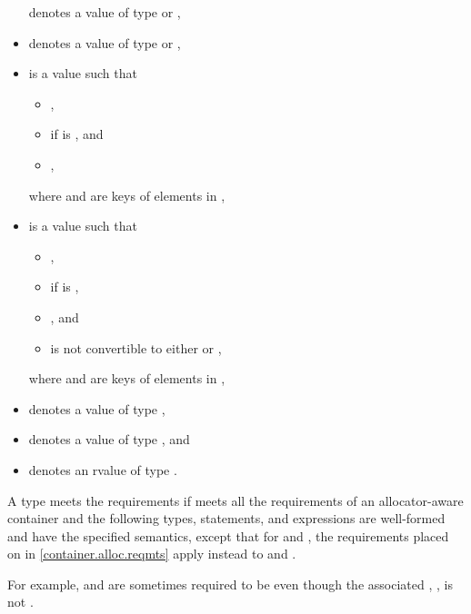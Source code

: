 \begin{itemize}
 denotes a value of type  or ,
\item
{} denotes a value of type  or ,
\item
{} is a value such that
  \begin{itemize}
  \item {},
  \item {} if  is , and
  \item {},
  \end{itemize}
  where  and  are keys of elements in ,
\item
{} is a value such that
  \begin{itemize}
  \item {},
  \item {} if  is ,
  \item {}, and
  \item {} is not convertible to
    either  or ,
  \end{itemize}
  where  and  are keys of elements in ,
\item
{} denotes a value of type ,
\item
{} denotes a value of type , and
\item
{} denotes an rvalue of type .
\end{itemize}

\pnum
A type  meets
the  requirements
if  meets all the requirements of
an allocator-aware container and
the following types, statements, and expressions are well-formed and
have the specified semantics,
except that for  and ,
the requirements placed on  in \ref{container.alloc.reqmts}
apply instead to  and .
\begin{note}
For example,  and 
are sometimes required to be 
even though the associated ,
,
is not .
\end{note}

